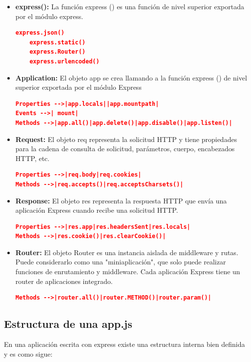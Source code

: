 \begin{itemize}

\item \textbf{express():} La función express () es una función de nivel superior exportada por el módulo express.
\begin{lstlisting}[language=JSON] 
    express.json()
    express.static()
    express.Router()
    express.urlencoded()
\end{lstlisting}
\item \textbf{Application:} El objeto app se crea llamando a la función express () de nivel superior exportada por el módulo Express
\begin{lstlisting}[language=JSON] 
Properties -->|app.locals||app.mountpath|
Events -->| mount|
Methods -->|app.all()|app.delete()|app.disable()|app.listen()|
\end{lstlisting}
\item \textbf{Request:} El objeto req representa la solicitud HTTP y tiene propiedades para la cadena de consulta de solicitud, parámetros, cuerpo, encabezados HTTP, etc.
\begin{lstlisting}[language=JSON] 
Properties -->|req.body|req.cookies|
Methods -->|req.accepts()|req.acceptsCharsets()|
\end{lstlisting}
\item \textbf{Response:} El objeto res representa la respuesta HTTP que envía una aplicación Express cuando recibe una solicitud HTTP.
\begin{lstlisting}[language=JSON] 
Properties -->|res.app|res.headersSent|res.locals|
Methods -->|res.cookie()|res.clearCookie()|
\end{lstlisting}
\item \textbf{Router:} El objeto Router es una instancia aislada de middleware y rutas. Puede considerarlo como una "miniaplicación", que solo puede realizar funciones de enrutamiento y middleware. Cada aplicación Express tiene un router de aplicaciones integrado.
\begin{lstlisting}[language=JSON] 
Methods -->|router.all()|router.METHOD()|router.param()|
\end{lstlisting}
\end{itemize}


\subsection{Estructura de una app.js}

En una aplicación escrita con express existe una estructura interna bien definida y es como sigue:


